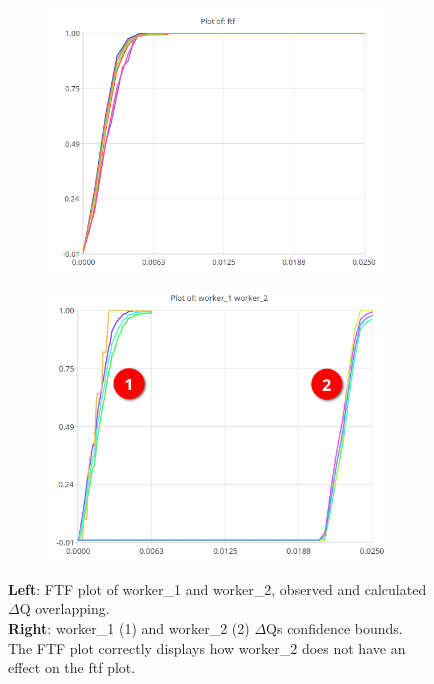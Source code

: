            \begin{figure}[H]
                \centering 
                \begin{subfigure}{.5\textwidth}
                    \centering
                    \includegraphics[width =0.98\textwidth]{img/ftf.png}
                    \label{fig:ftf_art_d}
                \end{subfigure}%
                \begin{subfigure}{.5\textwidth}%
                    \centering%
                    \includegraphics[width =0.98\textwidth]{img/delay32.png}%
                    \label{fig:ftf_art_dw}%
                \end{subfigure}%
                \caption{\textbf{Left}: FTF plot of worker\_1 and worker\_2, observed and calculated $\Delta$Q overlapping.\\
                \textbf{Right}: worker\_1 (1) and worker\_2 (2) $\Delta$Qs confidence bounds. \\
                The FTF plot correctly displays how worker\_2 does not have an effect on the ftf plot.}
                \label{fig:ftf_w1w2}%
            \end{figure}%

